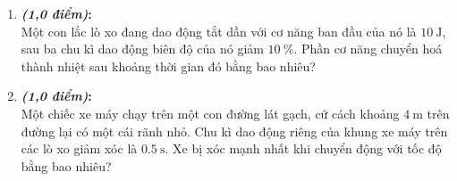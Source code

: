 \begin{enumerate}[label=\bfseries Câu \arabic*]
\item \textbf{\textit{(1,0 điểm)}:}\\
Một con lắc lò xo đang dao động tắt dần với cơ năng ban đầu của nó là $\SI{10}{\joule}$, sau ba chu kì dao động biên độ của nó giảm $\SI{10}{\percent}$. Phần cơ năng chuyển hoá thành nhiệt sau khoảng thời gian đó bằng bao nhiêu?

\item \textbf{\textit{(1,0 điểm)}:}\\
Một chiếc xe máy chạy trên một con đường lát gạch, cứ cách khoảng $\SI{4}{\meter}$ trên đường lại có một cái rãnh nhỏ. Chu kì dao động riêng của khung xe máy trên các lò xo giảm xóc là $\SI{0.5}{\second}$. Xe bị xóc mạnh nhất khi chuyển động với tốc độ bằng bao nhiêu?
\end{enumerate}